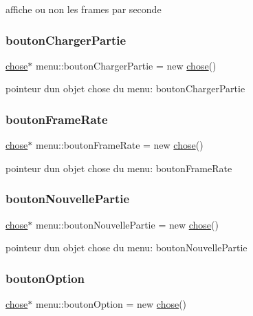 affiche ou non les frames par seconde \mbox{\label{classmenu_a4aa7938e119d5bc7878d2730c9634804}} 
\subsubsection{\texorpdfstring{bouton\+Charger\+Partie}{boutonChargerPartie}}
{\footnotesize\ttfamily \mbox{\hyperlink{classchose}{chose}}$\ast$ menu\+::bouton\+Charger\+Partie = new \mbox{\hyperlink{classchose}{chose}}()}

pointeur d\textquotesingle{}un objet chose du menu\+: bouton\+Charger\+Partie \mbox{\label{classmenu_a8b7d7c75aa9583ee7408e62c68a24866}} 
\subsubsection{\texorpdfstring{bouton\+Frame\+Rate}{boutonFrameRate}}
{\footnotesize\ttfamily \mbox{\hyperlink{classchose}{chose}}$\ast$ menu\+::bouton\+Frame\+Rate = new \mbox{\hyperlink{classchose}{chose}}()}

pointeur d\textquotesingle{}un objet chose du menu\+: bouton\+Frame\+Rate \mbox{\label{classmenu_ab8578fcf6302936279a95b52d334fd2f}} 
\subsubsection{\texorpdfstring{bouton\+Nouvelle\+Partie}{boutonNouvellePartie}}
{\footnotesize\ttfamily \mbox{\hyperlink{classchose}{chose}}$\ast$ menu\+::bouton\+Nouvelle\+Partie = new \mbox{\hyperlink{classchose}{chose}}()}

pointeur d\textquotesingle{}un objet chose du menu\+: bouton\+Nouvelle\+Partie \mbox{\label{classmenu_a68804b63c03d72f1666547f1f383b187}} 
\subsubsection{\texorpdfstring{bouton\+Option}{boutonOption}}
{\footnotesize\ttfamily \mbox{\hyperlink{classchose}{chose}}$\ast$ menu\+::bouton\+Option = new \mbox{\hyperlink{classchose}{chose}}()}

